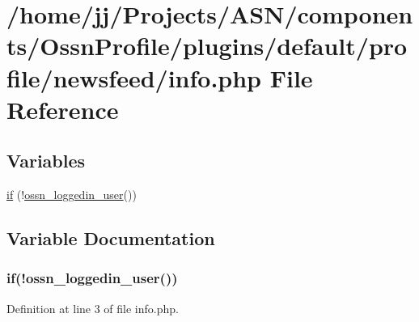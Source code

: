 \hypertarget{info_8php}{}\section{/home/jj/\+Projects/\+A\+S\+N/components/\+Ossn\+Profile/plugins/default/profile/newsfeed/info.php File Reference}
\label{info_8php}
\subsection*{Variables}
\begin{DoxyCompactItemize}
\item 
\hyperlink{info_8php_ab65d11102166934c05697cde3cfdab66}{if} (!\hyperlink{ossn_8lib_8users_8php_aa3c8068d0e6638b414d6a2f6c62565b8}{ossn\+\_\+loggedin\+\_\+user}())
\end{DoxyCompactItemize}


\subsection{Variable Documentation}
\subsubsection[{\texorpdfstring{if}{if}}]{\setlength{\rightskip}{0pt plus 5cm}if(!{\bf ossn\+\_\+loggedin\+\_\+user}())}\hypertarget{info_8php_ab65d11102166934c05697cde3cfdab66}{}\label{info_8php_ab65d11102166934c05697cde3cfdab66}


Definition at line 3 of file info.\+php.

